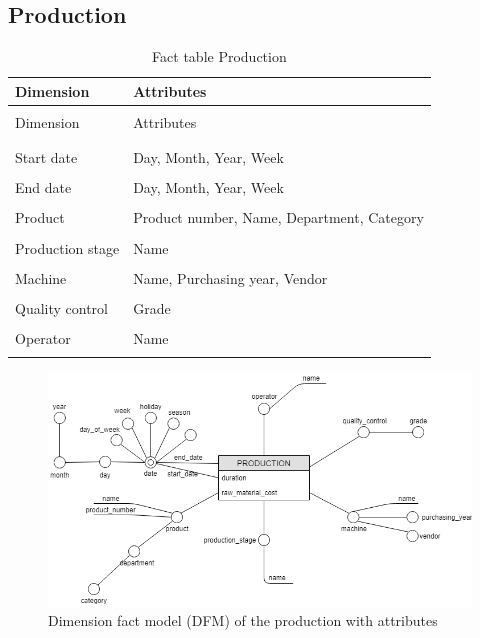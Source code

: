 \documentclass[letterpaper,12pt]{article}
\begin{document}
\subsection{Production}

\begingroup
\renewcommand\arraystretch{0.5}
\begin{longtable}{p{4cm}p{9cm}}
        \caption{Fact table Production} \\
        Dimension & Attributes \\
        \endfirsthead \\
        Dimension & Attributes \\
        \endhead \\
        \hline \\
        Start date & Day, Month, Year, Week \\
        \hline \\
        End date & Day, Month, Year, Week \\
        \hline \\
        Product & Product number, Name, Department, Category \\
        \hline \\
        Production stage & Name \\
        \hline \\
        Machine & Name, Purchasing year, Vendor \\
        \hline \\
        Quality control & Grade \\
        \hline \\
        Operator & Name \\
        \hline \\
\end{longtable}
\endgroup

\begin{figure}[h] 
        \centering
        \includegraphics[width=\columnwidth]{../images/DFM_Production.png}
        \caption{
                \label{fig:productionAttributes}  
                Dimension fact model (DFM) of the production with attributes 
        }
\end{figure}
\end{document}
